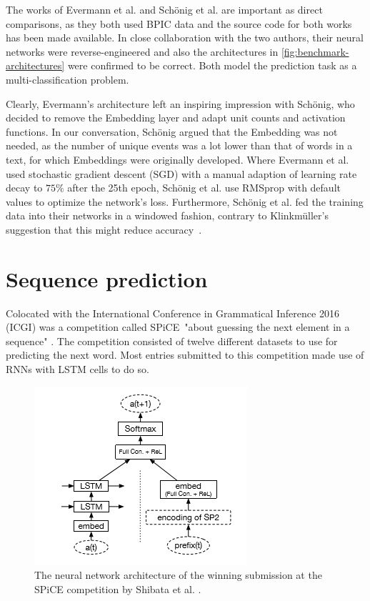 The works of Evermann et al. and Schönig et al. are important as direct comparisons, as they both used BPIC data and the source code for both works has been made available. In close collaboration with the two authors, their neural networks were reverse-engineered and also the architectures in \autoref{fig:benchmark-architectures} were confirmed to be correct. Both model the prediction task as a multi-classification problem.

Clearly, Evermann's architecture left an inspiring impression with Schönig, who decided to remove the Embedding layer and adapt unit counts and activation functions. In our conversation, Schönig argued that the Embedding was not needed, as the number of unique events was a lot lower than that of words in a text, for which Embeddings were originally developed. Where Evermann et al. used stochastic gradient descent (SGD) with a manual adaption of learning rate decay to $75\%$ after the 25th epoch, Schönig et al. use RMSprop with default values to optimize the network's loss. Furthermore, Schönig et al. fed the training data into their networks in a windowed fashion, contrary to Klinkmüller's suggestion that this might reduce accuracy~\cite{klinkmuller2018reliablemonitoring}.

\section{Sequence prediction}
\label{sec:related-work-sequence-prediction}
Colocated with the International Conference in Grammatical Inference 2016 (ICGI) was a competition called SPiCE\ "about guessing the next element in a sequence" \cite{web:spice}. The competition consisted of twelve different datasets to use for predicting the next word. Most entries submitted to this competition made use of RNNs with LSTM cells to do so.\\

\begin{figure}
    \centering
    \includegraphics[height=.4\textwidth]{gfx/spice-winner-architecture.png}
    \caption{The neural network architecture of the winning submission at the SPiCE competition by Shibata et al. \cite{shibata2016bipartite}.}
    \label{fig:spice-winner-architecture}
\end{figure}

